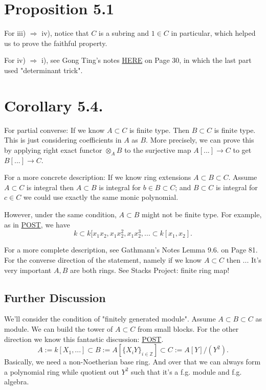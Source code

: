 
\section{Proposition 5.1}

For iii) $\Rightarrow$ iv), notice that $C$ is a subring and $1\in C$ in particular, which helped us to prove the faithful property.

For iv) $\Rightarrow$ i), see Gong Ting's notes \href{https://drive.google.com/file/d/12aM32lvgwaq9DI_ydv93aIty7Q1MhRmw/view}{HERE} on Page 30, in which the last part used "determinant trick".

\section{Corollary 5.4.}\label{Atiyah Corollary 5.4.}

For partial converse: If we know $A\subset C$ is finite type. Then $B\subset C$ is finite type. This is just considering coefficients in $A$ as $B$. More precisely, we can prove this by applying right exact functor $\otimes_{A}B$ to the surjective map $A[...]\to C$ to get $B[...]\to C$. 

For a more concrete description: If we know ring extensions $A\subset B\subset C$. Assume $A\subset C$ is integral then $A\subset B$ is integral for $b\in B\subset C$; and $B\subset C$ is integral for $c\in C$ we could use exactly the same monic polynomial. 

However, under the same condition, $A\subset B$ might not be finite type. For example, as in \href{https://math.stackexchange.com/questions/43353/transitivity-of-finitely-generated-condition}{POST}, we have 
\[k\subset k[x_1x_2, x_1x_2^2, x_1x_2^3,...\subset k[x_1,x_2].\]

For a more complete description, see Gathmann's Notes Lemma 9.6. on Page 81. For the converse direction of the statement, namely if we know $A\subset C$ then ... It's very important $A, B$ are both rings. See Stacks Project: finite ring map! 

\subsection{Further Discussion}

We'll consider the condition of "finitely generated module". Assume $A\subset B\subset C$ as module. We can build the tower of $A\subset C$ from small blocks. For the other direction we know this fantastic discussion: \href{https://math.stackexchange.com/questions/126946/a-subseteq-b-subseteq-c-ring-extensions-a-subseteq-c-finite-finitely-genera?rq=1}{POST}.
\[A:=k[X_1,...]\subset B:= A[\{X_iY\}_{i\in\mathbb Z}]\subset C:= A[Y]/(Y^2).\]
Basically, we need a non-Noetherian base ring. And over that we can always form a polynomial ring while quotient out $Y^2$ such that it's a f.g. module and f.g. algebra.


